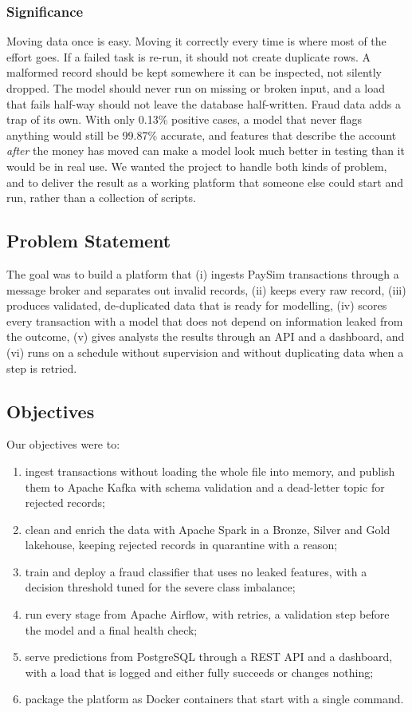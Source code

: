\documentclass[11pt,a4paper]{article}
\begin{document}
\subsubsection{Significance}
Moving data once is easy. Moving it correctly every time is where most of the
effort goes. If a failed task is re-run, it should not create duplicate rows. A
malformed record should be kept somewhere it can be inspected, not silently
dropped. The model should never run on missing or broken input, and a load that
fails half-way should not leave the database half-written. Fraud data adds a
trap of its own. With only 0.13\% positive cases, a model that never flags
anything would still be 99.87\% accurate, and features that describe the account
\emph{after} the money has moved can make a model look much better in testing
than it would be in real use. We wanted the project to handle both kinds of
problem, and to deliver the result as a working platform that someone else could
start and run, rather than a collection of scripts.

\subsection{Problem Statement}
The goal was to build a platform that (i) ingests PaySim transactions through a
message broker and separates out invalid records, (ii) keeps every raw record,
(iii) produces validated, de-duplicated data that is ready for modelling, (iv)
scores every transaction with a model that does not depend on information leaked
from the outcome, (v) gives analysts the results through an API and a dashboard,
and (vi) runs on a schedule without supervision and without duplicating data when
a step is retried.

\subsection{Objectives}
Our objectives were to:
\begin{enumerate}
  \item ingest transactions without loading the whole file into memory, and
        publish them to Apache Kafka with schema validation and a dead-letter
        topic for rejected records;
  \item clean and enrich the data with Apache Spark in a Bronze, Silver and Gold
        lakehouse, keeping rejected records in quarantine with a reason;
  \item train and deploy a fraud classifier that uses no leaked features, with a
        decision threshold tuned for the severe class imbalance;
  \item run every stage from Apache Airflow, with retries, a validation step
        before the model and a final health check;
  \item serve predictions from PostgreSQL through a REST API and a dashboard, with
        a load that is logged and either fully succeeds or changes nothing;
  \item package the platform as Docker containers that start with a single
        command.
\end{enumerate}
\end{document}
